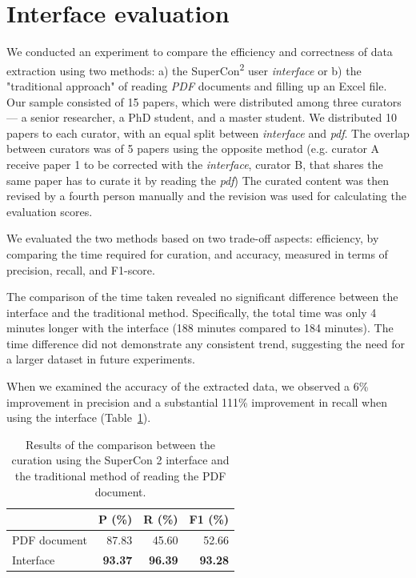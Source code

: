 \documentclass[a4paper]{article}
\begin{document}
\section{Interface evaluation}
\label{sec:interface-evaluation}
We conducted an experiment to compare the efficiency and correctness of data extraction using two methods: a) the SuperCon\textsuperscript{2} user \textit{interface} or b) the "traditional approach" of reading \textit{PDF} documents and filling up an Excel file. 
Our sample consisted of 15 papers, which were distributed among three curators — a senior researcher, a PhD student, and a master student. 
We distributed 10 papers to each curator, with an equal split between \textit{interface} and \textit{pdf}. The overlap between curators was of 5 papers using the opposite method (e.g. curator A receive paper 1 to be corrected with the \textit{interface}, curator B, that shares the same paper has to curate it by reading the \textit{pdf})
The curated content was then revised by a fourth person manually and the revision was used for calculating the evaluation scores. 

We evaluated the two methods based on two trade-off aspects: efficiency, by comparing the time required for curation, and accuracy, measured in terms of precision, recall, and F1-score.

The comparison of the time taken revealed no significant difference between the interface and the traditional method. Specifically, the total time was only 4 minutes longer with the interface (188 minutes compared to 184 minutes). The time difference did not demonstrate any consistent trend, suggesting the need for a larger dataset in future experiments.

When we examined the accuracy of the extracted data, we observed a 6\% improvement in precision and a substantial 111\% improvement in recall when using the interface (Table~\ref{tab:evaluation-interface-correction}). 

\begin{table}[ht]
\centering
\begin{tabular}{lrrr}
\toprule
                    & \textbf{P (\%)}   & \textbf{R (\%)}   & \textbf{F1 (\%)}  \\
    \midrule
    PDF document    & 87.83             & 45.60             & 52.66             \\
    Interface       & \textbf{93.37}    & \textbf{96.39}    & \textbf{93.28}    \\
    \bottomrule
\end{tabular}
\caption{Results of the comparison between the curation using the SuperCon 2 interface and the traditional method of reading the PDF document. }
\label{tab:evaluation-interface-correction}
\end{table}
\end{document}
